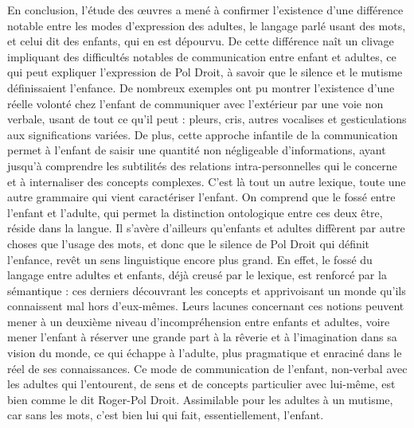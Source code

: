 \documentclass[a4paper,french,bookmarks]{article}
\begin{document}
\qquad En conclusion, l'étude des œuvres a mené à confirmer l'existence d'une différence notable entre les modes d'expression des adultes, le langage parlé usant des mots, et celui dit des enfants, qui en est dépourvu. De cette différence naît un clivage impliquant des difficultés notables de communication entre enfant et adultes, ce qui peut expliquer l'expression de Pol Droit, à savoir que le silence et le mutisme définissaient l'enfance. De nombreux exemples ont pu montrer l'existence d'une réelle volonté chez l'enfant de communiquer avec l'extérieur par une voie non verbale, usant de tout ce qu'il peut : pleurs, cris, autres vocalises et gesticulations aux significations variées. De plus, cette approche infantile de la communication permet à l'enfant de saisir une quantité non négligeable d'informations, ayant jusqu'à comprendre les subtilités des relations intra-personnelles qui le concerne et à internaliser des concepts complexes. C'est là tout un autre lexique, toute une autre grammaire qui vient caractériser l'enfant. On comprend que le fossé entre l'enfant et l'adulte, qui permet la distinction ontologique entre ces deux être, réside dans la langue. Il s'avère d'ailleurs qu'enfants et adultes diffèrent par autre choses que l'usage des mots, et donc que le silence de Pol Droit qui définit l'enfance, revêt un sens linguistique encore plus grand. En effet, le fossé du langage entre adultes et enfants, déjà creusé par le lexique, est renforcé par la sémantique : ces derniers découvrant les concepts et apprivoisant un monde qu'ils connaissent mal hors d'eux-mêmes. Leurs lacunes concernant ces notions peuvent mener à un deuxième niveau d'incompréhension entre enfants et adultes, voire mener l'enfant à réserver une grande part à la rêverie et à l'imagination dans sa vision du monde, ce qui échappe à l'adulte, plus pragmatique et enraciné dans le réel de ses connaissances. Ce mode de communication de l'enfant, non-verbal avec les adultes qui l'entourent, de sens et de concepts particulier avec lui-même, est bien  comme le dit Roger-Pol Droit. Assimilable pour les adultes à un mutisme, car sans les mots, c'est bien lui qui fait, essentiellement, l'enfant.
\end{document}
